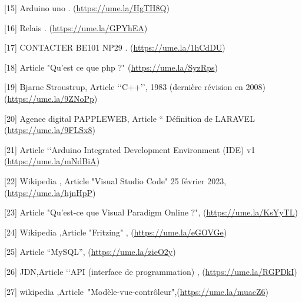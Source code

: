 [15] Arduino uno . (\url{https://ume.la/HgTH8Q})

[16] Relais . (\url{https://ume.la/GPYhEA})

[17] CONTACTER BE101 NP29 . (\url{https://ume.la/1hCdDU})

[18] Article "Qu'est ce que php ?" (\url{https://ume.la/SyzRps})

[19] Bjarne Stroustrup, Article ‘‘C++’’, 1983 (dernière révision en 2008)
(\url{https://ume.la/9ZNoPp})

[20] Agence digital PAPPLEWEB, Article “ Définition de LARAVEL (\url{https://ume.la/9FLSx8})

[21] Article ‘‘Arduino Integrated Development Environment (IDE) v1 (\url{https://ume.la/mNdBiA})

[22] Wikipedia , Article "Visual Studio Code" 25 février 2023,(\url{https://ume.la/hjnHpP})

[23] Article "Qu’est-ce que Visual Paradigm Online ?", (\url{https://ume.la/KsYyTL})

[24] Wikipedia ,Article "Fritzing" , (\url{https://ume.la/eGOVGe})

[25] Article “MySQL”, (\url{https://ume.la/zieO2y})

[26] JDN,Article ‘‘API (interface de programmation) , (\url{https://ume.la/RGPDkI})

[27] wikipedia ,Article "Modèle-vue-contrôleur",(\url{https://ume.la/muacZ6})
